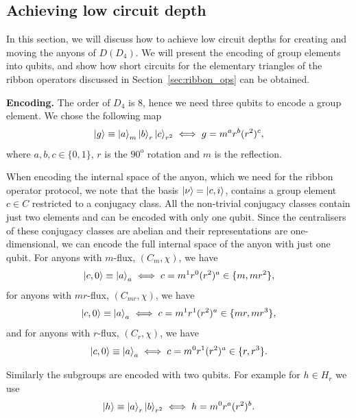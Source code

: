 \documentclass[a4paper,twocolumn,11pt, accepted=2024-06-14]{quantumarticle}
\begin{document}
\subsection{Achieving low circuit depth }\label{subsec:enc}

In this section, we will discuss how to achieve low circuit depths for creating and moving the anyons of $D(D_4)$. We will present the encoding of group elements into qubits, and show how short circuits for the elementary triangles of the ribbon operators discussed in Section~\ref{sec:ribbon_ops} can be obtained.

\textbf{Encoding.} 
The order of $D_4$ is 8, hence we need three qubits to encode a group element.
We chose the following map
\begin{equation}
    \ket{g} \equiv \ket{a}_m\ket{b}_r\ket{c}_{r^2} \iff g = m^a r^b (r^2)^c,
\end{equation}
where $a,b,c \in \{0,1\}$, $r$ is the $90^{\text{o}}$ rotation and $m$ is the reflection.


When encoding the internal space of the anyon, which we need for the ribbon operator protocol, we note that the basis $\ket{\nu} = \ket{c, i}$, contains a group element $c\in C$ restricted to a conjugacy class. All the non-trivial conjugacy classes contain just two elements and can be encoded with only one qubit. Since the centralisers of these conjugacy classes are abelian and their representations are one-dimensional, we can encode the full internal space of the anyon with just one qubit. For anyons with $m$-flux, $(C_m,\chi)$,
we have
\begin{equation}\label{eq:enc_C}
	\ket{c, 0} \equiv \ket{a}_{a} \iff c = m^1 r^0(r^2)^a \in \{m , mr^2\},
	\end{equation}
for anyons with $mr$-flux, $(C_{mr},\chi)$, we have	
\begin{equation}\label{eq:enc_C2}
	\ket{c, 0} \equiv \ket{a}_{a} \iff c = m^1 r^1(r^2)^a \in \{mr , mr^3\},
	\end{equation}
	and for anyons with $r$-flux, $(C_r,\chi)$, we have
\begin{equation}\label{eq:enc_C3}
	\ket{c, 0} \equiv \ket{a}_{a} \iff c = m^0 r^1(r^2)^a \in \{r , r^3\}.	
\end{equation}
			


Similarly the subgroups are encoded with two qubits. For example for $h\in H_r$ we use\begin{equation}
    \ket{h} \equiv \ket{a}_r\ket{b}_{r^2} \iff h = m^0r^a(r^2)^b.
\end{equation}
\end{document}
